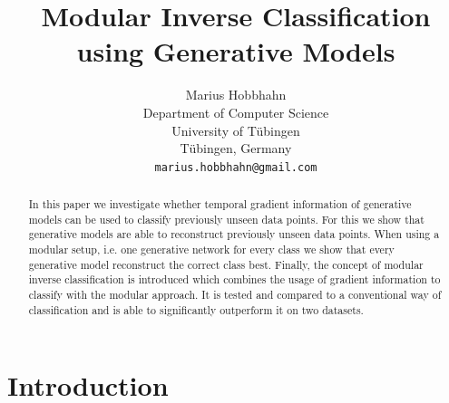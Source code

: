 \documentclass{article}
\title{Modular Inverse Classification using Generative Models}
\author{%
  Marius Hobbhahn \\
  Department of Computer Science\\
  University of Tübingen\\
  Tübingen, Germany \\
  \texttt{marius.hobbhahn@gmail.com} \\
}
\begin{document}
\maketitle


\begin{abstract}
	In this paper we investigate whether temporal gradient information of generative models can be used to classify previously unseen data points. For this we show that generative models are able to reconstruct previously unseen data points. When using a modular setup, i.e. one generative network for every class we show that every generative model reconstruct the correct class best. Finally, the concept of modular inverse classification is introduced which combines the usage of gradient information to classify with the modular approach. It is tested and compared to a conventional way of classification and is able to significantly outperform it on two datasets. 
\end{abstract}

\section{Introduction}
\end{document}
